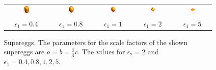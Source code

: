 \begin{figure}[htb]
\begin{tabular}{ccccc}
     \includegraphics[width=0.18\textwidth]{../images/form_factor/supershapes/SuperEggPietHein.png}
    & \includegraphics[width=0.18\textwidth]{../images/form_factor/supershapes/SuperEgg08.png}
    & \includegraphics[width=0.18\textwidth]{../images/form_factor/supershapes/SuperEgg1.png}
    & \includegraphics[width=0.18\textwidth]{../images/form_factor/supershapes/SuperEgg2.png}
    & \includegraphics[width=0.18\textwidth]{../images/form_factor/supershapes/SuperEgg5.png} \\
     $\epsilon_1=0.4$ & $\epsilon_1=0.8$ & $\epsilon_1=1$ & $\epsilon_1=2$ & $\epsilon_1=5$
\end{tabular}
\caption{Supereggs. The parameters for the scale factors of the shown supereggs are $a = b = \frac34 c $. The values for $\epsilon_2=2$ and $\epsilon_1=0.4, 0.8, 1,2,5$.}
\label{fig:opo_superegg}
\end{figure}

